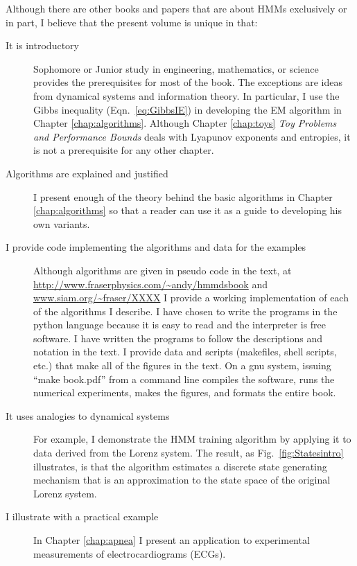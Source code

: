 \documentclass[dvips]{hmmdsbook}
\begin{document}
Although there are other books and papers that are about HMMs
exclusively or in part, I believe that the present volume is unique in
that:
\begin{description}
\item[It is introductory] Sophomore or Junior study in engineering,
  mathematics, or science provides the prerequisites for most of the
  book.  The exceptions are ideas from dynamical systems and
  information theory.  In particular, I use the Gibbs inequality
  (Eqn.~\eqref{eq:GibbsIE}) in developing the EM algorithm in Chapter
  \ref{chap:algorithms}.  Although Chapter \ref{chap:toys} \emph{Toy
    Problems and Performance Bounds} deals with Lyapunov exponents and
  entropies, it is not a prerequisite for any other chapter.
\item[Algorithms are explained and justified] I present enough of the
  theory behind the basic algorithms in Chapter \ref{chap:algorithms}
  so that a reader can use it as a guide to developing his own
  variants.
\item[I provide code implementing the algorithms and data for the
  examples] Although algorithms are given in pseudo code in the text,
  at \url{http://www.fraserphysics.com/~andy/hmmdsbook} and
  \url{www.siam.org/~fraser/XXXX} I provide a working implementation
  of each of the algorithms I describe.  I have chosen to write the
  programs in the python language because it is easy to read and the
  interpreter is free software.  I have written the programs to follow
  the descriptions and notation in the text.  I provide data and
  scripts (makefiles, shell scripts, etc.)  that make all of the
  figures in the text.  On a gnu system, issuing ``make book.pdf''
  from a command line compiles the software, runs the numerical
  experiments, makes the figures, and formats the entire book.
\item[It uses analogies to dynamical systems] For example, I
  demonstrate the HMM training algorithm by applying it to data
  derived from the Lorenz system.  The result, as
  Fig.~\ref{fig:Statesintro} illustrates, is that the algorithm
  estimates a discrete state generating mechanism that is an
  approximation to the state space of the original Lorenz system.
\item[I illustrate with a practical example] In Chapter \ref{chap:apnea} I
  present an application to experimental measurements of
  electrocardiograms (ECGs).
\end{description}

\end{document}
